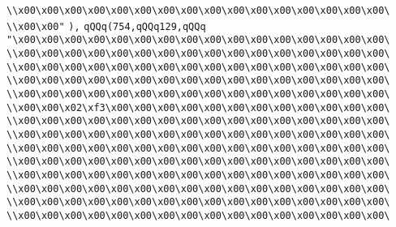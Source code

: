 \verb|\\x00\x00\x00\x00\x00\x00\x00\x00\x00\x00\x00\x00\x00\x00\x00\x00\|\newline
\verb|\\x00\x00"|\newline
\verb|),|\newline
\verb|qQQq(754,qQQq129,qQQq|\newline
\verb|"\x00\x00\x00\x00\x00\x00\x00\x00\x00\x00\x00\x00\x00\x00\x00\x00\|\newline
\verb|\\x00\x00\x00\x00\x00\x00\x00\x00\x00\x00\x00\x00\x00\x00\x00\x00\|\newline
\verb|\\x00\x00\x00\x00\x00\x00\x00\x00\x00\x00\x00\x00\x00\x00\x00\x00\|\newline
\verb|\\x00\x00\x00\x00\x00\x00\x00\x00\x00\x00\x00\x00\x00\x00\x00\x00\|\newline
\verb|\\x00\x00\x00\x00\x00\x00\x00\x00\x00\x00\x00\x00\x00\x00\x00\x00\|\newline
\verb|\\x00\x00\x02\xf3\x00\x00\x00\x00\x00\x00\x00\x00\x00\x00\x00\x00\|\newline
\verb|\\x00\x00\x00\x00\x00\x00\x00\x00\x00\x00\x00\x00\x00\x00\x00\x00\|\newline
\verb|\\x00\x00\x00\x00\x00\x00\x00\x00\x00\x00\x00\x00\x00\x00\x00\x00\|\newline
\verb|\\x00\x00\x00\x00\x00\x00\x00\x00\x00\x00\x00\x00\x00\x00\x00\x00\|\newline
\verb|\\x00\x00\x00\x00\x00\x00\x00\x00\x00\x00\x00\x00\x00\x00\x00\x00\|\newline
\verb|\\x00\x00\x00\x00\x00\x00\x00\x00\x00\x00\x00\x00\x00\x00\x00\x00\|\newline
\verb|\\x00\x00\x00\x00\x00\x00\x00\x00\x00\x00\x00\x00\x00\x00\x00\x00\|\newline
\verb|\\x00\x00\x00\x00\x00\x00\x00\x00\x00\x00\x00\x00\x00\x00\x00\x00\|\newline
\verb|\\x00\x00\x00\x00\x00\x00\x00\x00\x00\x00\x00\x00\x00\x00\x00\x00\|\newline
